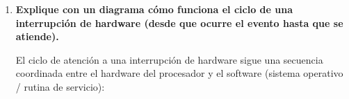 \documentclass[12pt,letterpaper]{article}
\begin{document}
\newpage
{}


\begin{enumerate}

    \item \textbf{\large\color{UCBlue}Explique con un diagrama cómo funciona el ciclo de una interrupción de hardware (desde que ocurre el evento hasta que se atiende).}
    
    \vspace{0.2cm}
    El ciclo de atención a una interrupción de hardware sigue una secuencia coordinada entre el hardware del procesador y el software (sistema operativo / rutina de servicio):


\end{enumerate}
\end{document}

